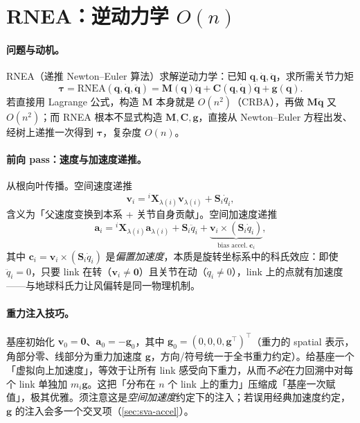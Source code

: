 \section{RNEA：逆动力学 \texorpdfstring{$O(n)$}{O(n)}}
\label{sec:on-rnea}

\paragraph{问题与动机。}
RNEA（递推 Newton--Euler 算法）求解逆动力学：已知 $\mathbf q,\dot{\mathbf q},\ddot{\mathbf q}$，求所需关节力矩
\begin{equation}
  \boldsymbol\tau=\mathrm{RNEA}(\mathbf q,\dot{\mathbf q},\ddot{\mathbf q})=\mathbf M(\mathbf q)\ddot{\mathbf q}+\mathbf C(\mathbf q,\dot{\mathbf q})\dot{\mathbf q}+\mathbf g(\mathbf q).
  \label{eq:on-rnea-def}
\end{equation}
若直接用 Lagrange 公式，构造 $\mathbf M$ 本身就是 $O(n^2)$（CRBA），再做 $\mathbf M\ddot{\mathbf q}$ 又 $O(n^2)$；而 RNEA 根本不显式构造 $\mathbf M,\mathbf C,\mathbf g$，直接从 Newton--Euler 方程出发、经树上递推一次得到 $\boldsymbol\tau$，复杂度 $O(n)$。

\paragraph{前向 pass：速度与加速度递推。}
从根向叶传播。空间速度递推
\begin{equation}
  \mathbf v_i={}^i\mathbf X_{\lambda(i)}\mathbf v_{\lambda(i)}+\mathbf S_i\dot q_i,
  \label{eq:on-vrec}
\end{equation}
含义为「父速度变换到本系 + 关节自身贡献」。空间加速度递推
\begin{equation}
  \mathbf a_i={}^i\mathbf X_{\lambda(i)}\mathbf a_{\lambda(i)}+\mathbf S_i\ddot q_i+\underbrace{\mathbf v_i\times(\mathbf S_i\dot q_i)}_{\text{bias accel.}\;\mathbf c_i},
  \label{eq:on-arec}
\end{equation}
其中 $\mathbf c_i=\mathbf v_i\times(\mathbf S_i\dot q_i)$ 是\emph{偏置加速度}，本质是旋转坐标系中的科氏效应：即使 $\ddot q_i=0$，只要 link 在转（$\mathbf v_i\neq\mathbf 0$）且关节在动（$\dot q_i\neq0$），link 上的点就有加速度——与地球科氏力让风偏转是同一物理机制。

\paragraph{重力注入技巧。}
基座初始化 $\mathbf v_0=\mathbf 0$、$\mathbf a_0=-\mathbf g_0$，其中 $\mathbf g_0=(0,0,0,\mathbf g^\top)^\top$（重力的 spatial 表示，角部分零、线部分为重力加速度 $\mathbf g$，方向/符号统一于全书重力约定）。给基座一个「虚拟向上加速度」，等效于让所有 link 感受向下重力，从而\emph{不必}在力回溯中对每个 link 单独加 $m_i\mathbf g$。这把「分布在 $n$ 个 link 上的重力」压缩成「基座一次赋值」，极其优雅。须注意这是\emph{空间加速度}约定下的注入；若误用经典加速度约定，$\mathbf g$ 的注入会多一个交叉项（\cref{sec:sva-accel}）。

